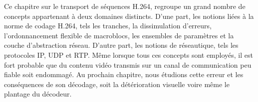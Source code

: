 Ce chapitre sur le transport de séquences H.264, regroupe un grand nombre de
concepts appartenant à deux domaines distincts. D'une part, les notions liées à
la norme de codage H.264, tels les tranches, la dissimulation d'erreurs,
l'ordonnancement flexible de macroblocs, les ensembles de paramètres et la
couche d'abstraction réseau. D'autre part, les notions de réseautique, tels les
protocoles IP, UDP et RTP. Même lorsque tous ces concepts sont employés, il est
fort probable que du contenu vidéo transmis sur un canal de communication peu
fiable soit endommagé. Au prochain chapitre, nous étudions cette erreur et les
conséquences de son décodage, soit la détérioration visuelle voire même le
plantage du décodeur.
